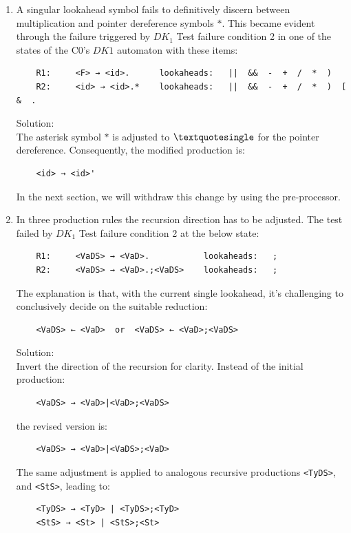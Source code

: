 \begin{enumerate}
    \item A singular lookahead symbol fails to definitively discern between multiplication and pointer dereference symbols \(\ast\). This became evident through the failure triggered by \({DK_{1}}\) Test failure condition 2 in one of the states of the C0's \(DK1\) automaton with these items:
    \begin{verbatim}
    R1:     <F> → <id>.      lookaheads:   ||  &&  -  +  /  *  )
    R2:     <id> → <id>.*    lookaheads:   ||  &&  -  +  /  *  )  [  &  .
    \end{verbatim}
    Solution: \\
    The asterisk symbol \(\ast\) is adjusted to \(\textquotesingle\) for the pointer dereference. Consequently, the modified production is:
    \begin{verbatim}
    <id> → <id>'
    \end{verbatim}
    In the next section, we will withdraw this change by using the pre-processor.

    \item In three production rules the recursion direction has to be adjusted.
    The test failed by \({DK_{1}}\) Test failure condition 2 at the below state:
    \begin{verbatim}
    R1:     <VaDS> → <VaD>.           lookaheads:   ;
    R2:     <VaDS> → <VaD>.;<VaDS>    lookaheads:   ;
    \end{verbatim}
    The explanation is that, with the current single lookahead, it’s challenging to conclusively decide on the suitable reduction:
    \begin{verbatim}
    <VaDS> ← <VaD>  or  <VaDS> ← <VaD>;<VaDS>
    \end{verbatim}

    Solution: \\
    Invert the direction of the recursion for clarity. Instead of the initial production:
    \begin{verbatim}
    <VaDS> → <VaD>|<VaD>;<VaDS>
    \end{verbatim}
    the revised version is:
    \begin{verbatim}
    <VaDS> → <VaD>|<VaDS>;<VaD>
    \end{verbatim}

    The same adjustment is applied to analogous recursive productions \texttt{<TyDS>}, and \texttt{<StS>}, leading to:
    \begin{verbatim}
    <TyDS> → <TyD> | <TyDS>;<TyD>
    <StS> → <St> | <StS>;<St>
    \end{verbatim}


\end{enumerate}

